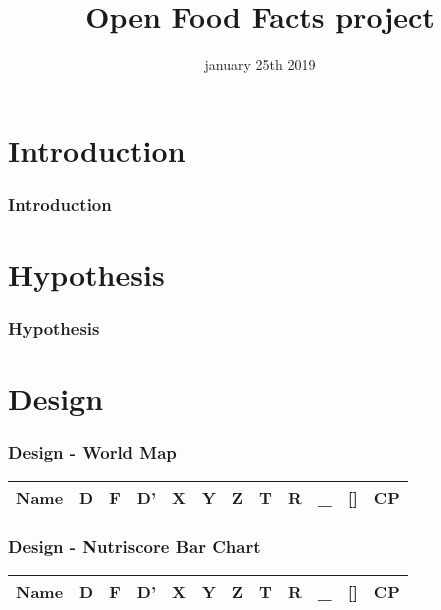 \documentclass{beamer}
\begin{document}

\title{Open Food Facts project}
\author{ } 
\date{january 25th 2019}

\maketitle

\section{Introduction}

\begin{frame}
\frametitle{Introduction}
\end{frame}

\section{Hypothesis}

\begin{frame}
\frametitle{Hypothesis}
\end{frame}

\section{Design}

\begin{frame}
\frametitle{Design - World Map}

\begin{table}
\centering
\begin{tabular}{|c|c|c|c||c|c|c|c|c|c|c||c|}
\hline
Name & D & F & D' & X & Y & Z & T & R & \_ & [] & CP\\
\hline
\end{tabular}
\end{table}

\end{frame}

\begin{frame}
\frametitle{Design - Nutriscore Bar Chart}

\begin{table}
\centering
\begin{tabular}{|c|c|c|c||c|c|c|c|c|c|c||c|}
\hline
Name & D & F & D' & X & Y & Z & T & R & \_ & [] & CP\\
\hline
\end{tabular}
\end{table}

\end{frame}
\end{document}
